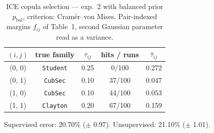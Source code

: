 \begin{table}[htbp]
  \centering
  \caption{ICE copula selection — exp.\ 2 with balanced prior $p_{\text{bal}}$, criterion: Cram\'er--von Mises. Pair-indexed margins $f_{ij}$ of Table~1, second Gaussian parameter read as a variance.}
  \label{tab:exp3-exp2_bal_p__cvm}
  \begin{tabular}{ccccc}
    \toprule
    $(i, j)$ & true family & $\tau_{ij}$ & hits / runs & $\hat\tau_{ij}$ \\
    \midrule
    (0, 0) & \texttt{Student} & 0.25 & 0/100 & 0.272 \\
    (0, 1) & \texttt{CubSec} & 0.10 & 37/100 & 0.047 \\
    (1, 0) & \texttt{CubSec} & 0.10 & 44/100 & 0.053 \\
    (1, 1) & \texttt{Clayton} & 0.20 & 67/100 & 0.159 \\
    \bottomrule
  \end{tabular}
  \par\smallskip Supervised error: 20.70\% ($\pm$ 0.97). Unsupervised: 21.10\% ($\pm$ 1.01).
\end{table}
